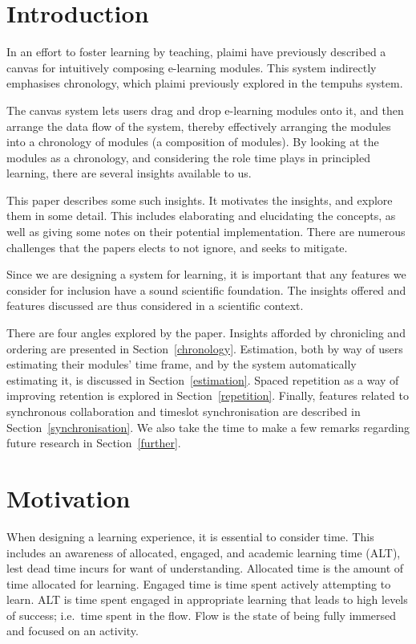 \documentclass{article}
\begin{document}
\begin{multicols}{2}
    \section{Introduction}
In an effort to foster learning by teaching, plaimi have previously described 
a canvas for intuitively composing e-learning 
modules\cite{berntsen2015enabling}. This system indirectly emphasises 
chronology, which plaimi previously explored in the tempuhs 
system\cite{berntsen2014tempuhs}.

The canvas system lets users drag and drop e-learning modules onto it, and 
then arrange the data flow of the system, thereby effectively arranging the 
modules into a chronology of modules (a composition of modules). By looking at 
the modules as a chronology, and considering the role time plays in principled 
learning, there are several insights available to us.

This paper describes some such insights. It motivates the insights, and 
explore them in some detail. This includes elaborating and elucidating the 
concepts, as well as giving some notes on their potential implementation. 
There are numerous challenges that the papers elects to not ignore, and seeks 
to mitigate.

Since we are designing a system for learning, it is important that any 
features we consider for inclusion have a sound scientific foundation. The 
insights offered and features discussed are thus considered in a scientific 
context.

There are four angles explored by the paper. Insights afforded by chronicling 
and ordering are presented in Section~\ref{chronology}. Estimation, both by 
way of users estimating their modules' time frame, and by the system 
automatically estimating it, is discussed in Section~\ref{estimation}. Spaced 
repetition as a way of improving retention is explored in 
Section~\ref{repetition}. Finally, features related to synchronous 
collaboration and timeslot synchronisation are described in 
Section~\ref{synchronisation}. We also take the time to make a few remarks 
regarding future research in Section~\ref{further}.
 \section{Motivation}
When designing a learning experience, it is essential to consider time. This 
includes an awareness of allocated, engaged, and academic learning time (ALT), 
lest dead time incurs for want of understanding. Allocated time is the amount 
of time allocated for learning. Engaged time is time spent actively attempting 
to learn. ALT is time spent engaged in appropriate learning that leads to high 
levels of success\cite{cotton1990educational}; i.e.\ time spent in the flow. 
Flow is the state of being fully immersed and focused on an 
activity\cite{murphy2011games}.


\end{multicols}
\end{document}
